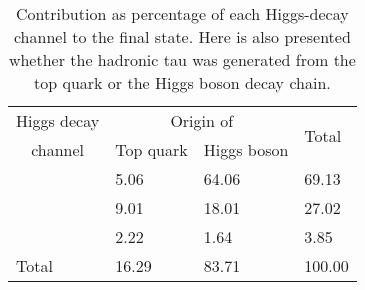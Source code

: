 \begin{table}[h]
\centering
\begin{tabular}{l|ll|l}
\toprule
       \multicolumn{1}{c|}{Higgs decay} 	& \multicolumn{2}{c|}{Origin of \tauhad} &    \multirow{2}{*}{Total}     \\ \cline{2-3}
      \multicolumn{1}{c|}{channel}  		& Top quark        				& Higgs boson       &   \\ \midrule
\Htautau 	& 5.06      					& 64.06        		      			& 69.13	\\
\HWW    	& 9.01         				& 18.01              				& 27.02 	\\
\HZZ    	& 2.22          				& 1.64               				& 3.85   	\\ 
\midrule
Total  	& 16.29           				& 83.71              				& 100.00 	\\
\bottomrule
\end{tabular}
\caption{Contribution as percentage of each Higgs-decay channel to the \dileptau final state. Here is also presented whether the hadronic tau was generated from the top quark or the Higgs boson decay chain.}
\label{tab:ChaptH:TruthSummary}
\end{table}
	





